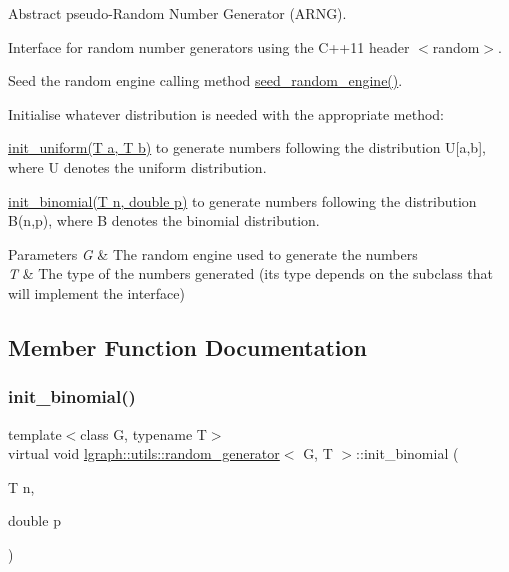 Abstract pseudo-\/\+Random Number Generator (A\+R\+NG). 

Interface for random number generators using the C++11 header $<$random$>$.

Seed the random engine calling method \hyperlink{classlgraph_1_1utils_1_1random__generator_a4eb6998070eecb59bd89dca92d8a509c}{seed\+\_\+random\+\_\+engine()}.

Initialise whatever distribution is needed with the appropriate method\+:
\begin{DoxyItemize}
\item \hyperlink{classlgraph_1_1utils_1_1random__generator_a129da597bed5b08e9c7e5a3ddce4287c}{init\+\_\+uniform(\+T a, T b)} to generate numbers following the distribution U\mbox{[}a,b\mbox{]}, where U denotes the uniform distribution.
\item \hyperlink{classlgraph_1_1utils_1_1random__generator_a71976e6ecbbd49de85ac270085832df1}{init\+\_\+binomial(\+T n, double p)} to generate numbers following the distribution B(n,p), where B denotes the binomial distribution.
\end{DoxyItemize}


\begin{DoxyParams}{Parameters}
{\em G} & The random engine used to generate the numbers \\
\hline
{\em T} & The type of the numbers generated (its type depends on the subclass that will implement the interface) \\
\hline
\end{DoxyParams}


\subsection{Member Function Documentation}
\mbox{\label{classlgraph_1_1utils_1_1random__generator_a71976e6ecbbd49de85ac270085832df1}} 
\subsubsection{\texorpdfstring{init\+\_\+binomial()}{init\_binomial()}}
{\footnotesize\ttfamily template$<$class G, typename T$>$ \\
virtual void \hyperlink{classlgraph_1_1utils_1_1random__generator}{lgraph\+::utils\+::random\+\_\+generator}$<$ G, T $>$\+::init\+\_\+binomial (\begin{DoxyParamCaption}\item[{T}]{n,  }\item[{double}]{p }\end{DoxyParamCaption})\hspace{0.3cm}{\ttfamily [pure virtual]}}



